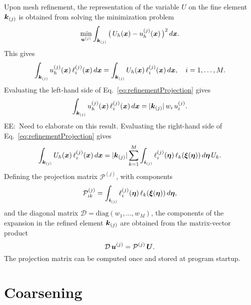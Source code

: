 \documentclass[10pt]{article}
\newcommand{\ee}[1]{{\color{blue} EE:~#1}}
\begin{document}
Upon mesh refinement, the representation of the variable $U$ on the fine element $\boldsymbol{k}_{(j)}$ is obtained from solving the minimization problem
\begin{equation}
  \min_{\boldsymbol{u}^{(j)}}\int_{\boldsymbol{k}_{(j)}}\big(\,U_{h}(\boldsymbol{x})-u_{h}^{(j)}(\boldsymbol{x})\,\big)^{2}\,d\boldsymbol{x}.
\end{equation}
This gives
\begin{equation}
  \int_{\boldsymbol{k}_{(j)}}u_{h}^{(j)}(\boldsymbol{x})\,\ell_{i}^{(j)}(\boldsymbol{x})\,d\boldsymbol{x}
  =\int_{\boldsymbol{k}_{(j)}}U_{h}(\boldsymbol{x})\,\ell_{i}^{(j)}(\boldsymbol{x})\,d\boldsymbol{x},\quad i=1,\ldots,M.
  \label{eq:refinementProjection}
\end{equation}
Evaluating the left-hand side of Eq.~\eqref{eq:refinementProjection} gives
\begin{equation}
  \int_{\boldsymbol{k}_{(j)}}u_{h}^{(j)}(\boldsymbol{x})\,\ell_{i}^{(j)}(\boldsymbol{x})\,d\boldsymbol{x}
  =|\boldsymbol{k}_{(j)}|\,w_{i}\,u_{i}^{(j)}.
\end{equation}
\ee{Need to elaborate on this result.}
Evaluating the right-hand side of Eq.~\eqref{eq:refinementProjection} gives
\begin{equation}
  \int_{\boldsymbol{k}_{(j)}}U_{h}(\boldsymbol{x})\,\ell_{i}^{(j)}(\boldsymbol{x})\,d\boldsymbol{x}
  =|\boldsymbol{k}_{(j)}|\sum_{k=1}^{M}\int_{\boldsymbol{i}_{(j)}}\ell_{i}^{(j)}(\boldsymbol{\eta})\,\ell_{k}(\boldsymbol{\xi}(\boldsymbol{\eta}))\,d\boldsymbol{\eta}\,U_{k}.
\end{equation}
Defining the projection matrix $\mathcal{P}^{(j)}$, with components
\begin{equation}
  \mathcal{P}_{ik}^{(j)} = \int_{\boldsymbol{i}_{(j)}}\ell_{i}^{(j)}(\boldsymbol{\eta})\,\ell_{k}(\boldsymbol{\xi}(\boldsymbol{\eta}))\,d\boldsymbol{\eta},
  \label{eq:refinementProjectionMatrix}
\end{equation}
and the diagonal matrix $\mathcal{D}=\mbox{diag}(w_{1},\ldots,w_{M})$, the components of the expansion in the refined element $\boldsymbol{k}_{(j)}$ are obtained from the matrix-vector product
\begin{equation}
  \mathcal{D}\,\boldsymbol{u}^{(j)} = \mathcal{P}^{(j)}\,\boldsymbol{U}.
\end{equation}
The projection matrix can be computed once and stored at program startup.

\section{Coarsening}
\end{document}

